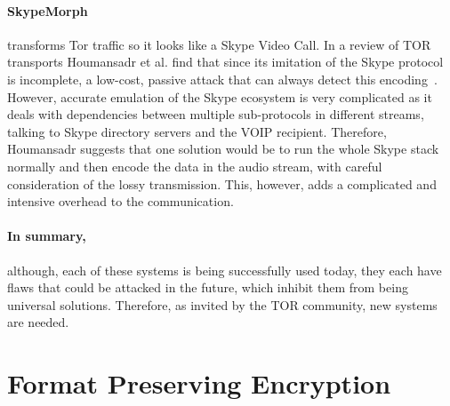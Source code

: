 \documentclass[ %
                    author={Samuel Russell},
                supervisor={Prof. Bogdan Warinschi},
                    degree={MEng},
                     title={Innocuous Ciphertexts},
                  subtitle={The DE-CENSOR Scheme},
                      type={research},
                      year={2018} ]{dissertation}
\begin{document}
\paragraph{SkypeMorph} transforms Tor traffic so it looks like a Skype Video Call.
In a review of TOR transports Houmansadr et al. find that since its imitation of the Skype protocol is incomplete, a low-cost, passive attack that can always detect this encoding~\cite{parot}.
However, accurate emulation of the Skype ecosystem is very complicated as it deals with dependencies between multiple sub-protocols in different streams, talking to Skype directory servers and the VOIP recipient. Therefore, Houmansadr suggests that one solution would be to run the whole Skype stack normally and then encode the data in the audio stream, with careful consideration of the lossy transmission. This, however, adds a complicated and intensive overhead to the communication.

\paragraph{In summary,} although, each of these systems is being successfully used today, they each have flaws that could be attacked in the future, which inhibit them from being universal solutions. Therefore, as invited by the TOR community, new systems are needed.

%
%



\section{Format Preserving Encryption}
\end{document}
